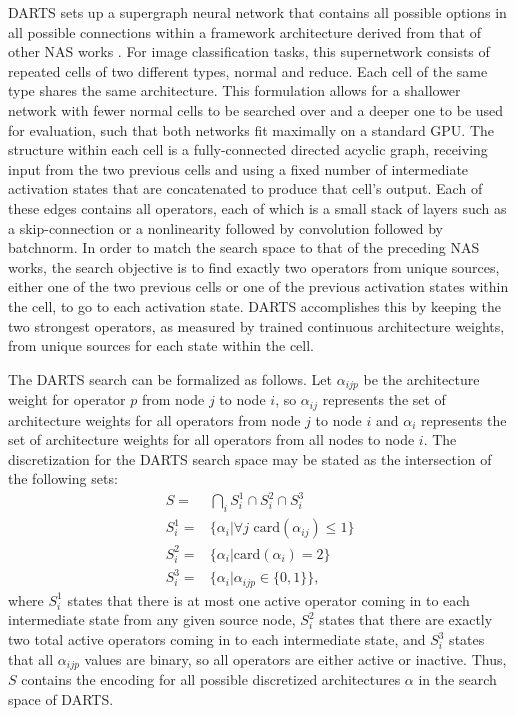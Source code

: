 \documentclass[letterpaper]{article} \usepackage{aaai22}  \usepackage{times}  \usepackage{helvet}  \usepackage{courier}  \usepackage[hyphens]{url}  \usepackage{graphicx} \urlstyle{rm} \def\UrlFont{\rm}  \usepackage{natbib}  \usepackage{caption} \DeclareCaptionStyle{ruled}{labelfont=normalfont,labelsep=colon,strut=off} \frenchspacing  \setlength{\pdfpagewidth}{8.5in}  \setlength{\pdfpageheight}{11in}  \usepackage{algorithm}
\begin{document}
DARTS sets up a supergraph neural network that contains all possible options in all possible connections within a framework architecture derived from that of other NAS works \cite{zoph2017neural,real2019regularized}. For image classification tasks, this supernetwork consists of repeated cells of two different types, normal and reduce. Each cell of the same type shares the same architecture. This formulation allows for a shallower network with fewer normal cells to be searched over and a deeper one to be used for evaluation, such that both networks fit maximally on a standard GPU. The structure within each cell is a fully-connected directed acyclic graph, receiving input from the two previous cells and using a fixed number of intermediate activation states that are concatenated to produce that cell's output. Each of these edges contains all operators, each of which is a small stack of layers such as a skip-connection or a nonlinearity followed by convolution followed by batchnorm. In order to match the search space to that of the preceding NAS works, the search objective is to find exactly two operators from unique sources, either one of the two previous cells or one of the previous activation states within the cell, to go to each activation state. DARTS accomplishes this by keeping the two strongest operators, as measured by trained continuous architecture weights, from unique sources for each state within the cell. 

The DARTS search can be formalized as follows. Let $\alpha_{ijp}$ be the architecture weight for operator $p$ from node $j$ to node $i$, so $\alpha_{ij}$ represents the set of architecture weights for all operators from node $j$ to node $i$ and $\alpha_{i}$ represents the set of architecture weights for all operators from all nodes to node $i$. The discretization for the DARTS search space may be stated as the intersection of the following sets:
\begin{align}
  S =& \bigcap\limits_{i} S_i^1 \cap S_i^2 \cap S_i^3 \label{eq:Sset} \\
  S_i^1 =& \{\alpha_i | \forall j \text{ card}(\alpha_{ij}) \le 1\} \label{eq:S1}\\
  S_i^2 =& \{\alpha_i | \text{card}(\alpha_i) = 2\}  \label{eq:S2}\\
  S_i^3 =& \{\alpha_i | \alpha_{ijp} \in \{0,1\}\} \label{eq:S3},
\end{align}
where $S_i^1$ states that there is at most one active operator coming in to each intermediate state from any given source node, $S_i^2$ states that there are exactly two total active operators coming in to each intermediate state, and $S_i^3$ states that all $\alpha_{ijp}$ values are binary, so all operators are either active or inactive. Thus, $S$ contains the encoding for all possible discretized architectures $\alpha$ in the search space of DARTS.
\end{document}
